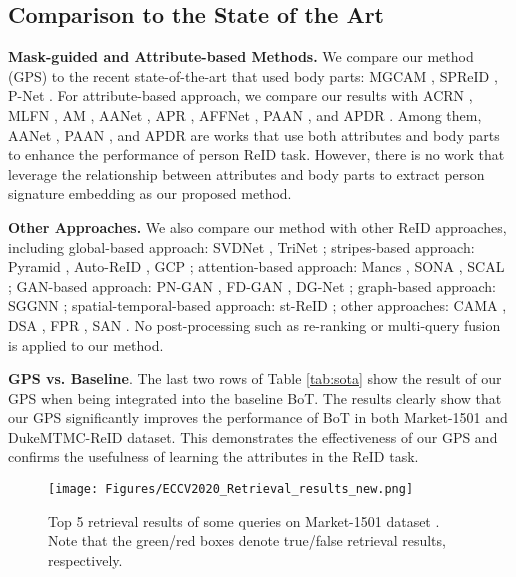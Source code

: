 \documentclass[final]{cvpr}
\begin{document}
\subsection{Comparison to the State of the Art}





\textbf{Mask-guided and Attribute-based Methods.} We compare our method (GPS) to the recent state-of-the-art that used body parts: MGCAM \cite{MGCAM}, SPReID \cite{SPReID}, P-Net \cite{p2net}. For attribute-based approach, we compare our results with ACRN \cite{ACRN}, MLFN \cite{mlfn}, AM \cite{a3m}, AANet \cite{aanet}, APR \cite{attreid}, AFFNet \cite{affnet}, PAAN \cite{PAAN}, and APDR \cite{apdr}. Among them, AANet \cite{aanet}, PAAN \cite{PAAN}, and APDR \cite{apdr} are works that use both attributes and body parts to enhance the performance of person ReID task. However, there is no work that leverage the relationship between attributes and body parts to extract person signature embedding as our proposed method. 

\textbf{Other Approaches.} We also compare our method with other ReID approaches, including global-based approach: SVDNet \cite{svdnet}, TriNet \cite{triplet}; stripes-based approach: Pyramid \cite{pyramid}, Auto-ReID \cite{auto-reid}, GCP \cite{MGCAM}; attention-based approach: Mancs \cite{mancs}, SONA \cite{sona}, SCAL \cite{scal}; GAN-based approach: PN-GAN \cite{PN-GAN}, FD-GAN \cite{FD-GAN}, DG-Net \cite{dg-net}; graph-based approach: SGGNN \cite{sggnn}; spatial-temporal-based approach: st-ReID \cite{st-ReID}; other approaches: CAMA \cite{cama}, DSA \cite{dsa}, FPR \cite{fpr}, SAN \cite{san}. No post-processing such as re-ranking \cite{re-ranking} or multi-query fusion \cite{market1501} is applied to our method.

\textbf{GPS vs. Baseline}. The last two rows of Table \ref{tab:sota} show the result of our GPS when being integrated into the baseline BoT. The results clearly show that our GPS significantly improves the performance of BoT in both Market-1501 and DukeMTMC-ReID dataset. This demonstrates the effectiveness of our GPS and confirms the usefulness of learning the attributes in the ReID task.

\begin{figure*}
    \centering
    \texttt{[image: Figures/ECCV2020\_Retrieval\_results\_new.png]}
    \caption{Top 5 retrieval results of some queries on Market-1501 dataset \cite{market1501}. Note that the green/red boxes denote true/false retrieval results, respectively.}
    \label{fig:visualization}
\end{figure*}
\end{document}
